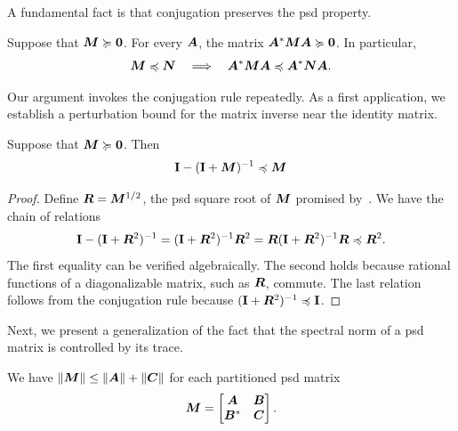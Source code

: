 \documentclass[final]{siamltex}
\begin{document}
A fundamental fact is that conjugation preserves the psd property.

\lsp

\begin{proposition}
\label{prop:conjugation}
Suppose that $\bm{M} \succcurlyeq \bm{0}$.  For every $\bm{A}$, the
matrix $\bm{A}^* \bm{M} \bm{A} \succcurlyeq \bm{0}$.  In
particular,
$$
\bm{M} \preccurlyeq \bm{N} \quad\Longrightarrow\quad \bm{A}^*
\bm{M} \bm{A} \preccurlyeq \bm{A}^* \bm{N} \bm{A}.
$$
\end{proposition}

Our argument invokes the conjugation rule repeatedly.  As a
first application, we establish a perturbation bound for the
matrix inverse near the identity matrix.

\lsp

\begin{proposition} \label{prop:perturb-inv}
Suppose that $\bm{M} \succcurlyeq \bm{0}$.  Then
$$
\mathbf{I} - (\mathbf{I} + \bm{M})^{-1} \preccurlyeq \bm{M}
$$
\end{proposition}


\begin{proof}
Define $\bm{R} = \bm{M}^{1/2}$, the psd square root of $\bm{M}$
promised by~\cite[Thm.~7.2.6]{HJ85:Matrix-Analysis}.  We have the
chain of relations
$$
\mathbf{I} - (\mathbf{I} + \bm{R}^2)^{-1} = (\mathbf{I} + \bm{R}^2)^{-1} \bm{R}^2
    = \bm{R} (\mathbf{I} + \bm{R}^2)^{-1} \bm{R}
    \preccurlyeq \bm{R}^2.
$$
The first equality can be verified algebraically.  The second
holds because rational functions of a diagonalizable matrix, such
as $\bm{R}$, commute.  The last relation follows from the
conjugation rule because $(\mathbf{I} + \bm{R}^2)^{-1} \preccurlyeq \mathbf{I}$.
\end{proof}

\lsp

Next, we present a generalization of the fact that the spectral norm
of a psd matrix is controlled by its trace.

\lsp

\begin{proposition}
    \label{prop:spec-norm-sum}
We have $\left\Vert {\bm{M}} \right\Vert \leq \left\Vert {\bm{A}} \right\Vert + \left\Vert {\bm{C}} \right\Vert$
for each partitioned psd matrix
\begin{equation*} \label{eqn:M-matrix}
\mtx{M} =
\begin{bmatrix} \mtx{A} & \mtx{B} \\ \mtx{B}^\adj &
\mtx{C} \end{bmatrix}.
\end{equation*}
\end{proposition}
\end{document}
